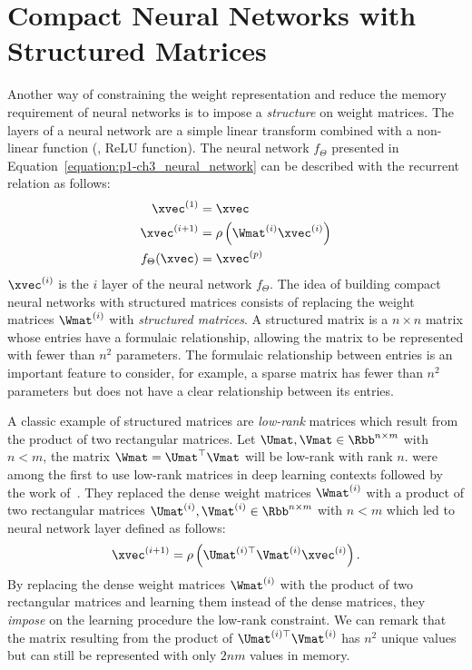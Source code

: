 %



\section{Compact Neural Networks with Structured Matrices}
\label{section:p1-ch3-compact_neural_networks_with_structured_matrices}


Another way of constraining the weight representation and reduce the memory requirement of neural networks is to impose a \emph{structure} on weight matrices. 
The layers of a neural network are a simple linear transform combined with a non-linear function (\eg, ReLU function). 
The neural network $f_\Theta$ presented in Equation~\ref{equation:p1-ch3_neural_network} can be described with the recurrent relation as follows:
\begin{align}
  \xvec^{(1)} &= \xvec \\
  \xvec^{(i+1)} &= \rho\left( \Wmat^{(i)} \xvec^{(i)} \right) \\
  f_\Theta(\xvec) &= \xvec^{(p)}
\end{align}
$\xvec^{(i)}$ is the $i$ layer of the neural network $f_\Theta$.
The idea of building compact neural networks with structured matrices consists of replacing the weight matrices $\Wmat^{(i)}$ with \emph{structured matrices}.
A structured matrix is a $n \times n$ matrix whose entries have a formulaic relationship, allowing the matrix to be represented with fewer than $n^2$ parameters.
The formulaic relationship between entries is an important feature to consider, for example, a sparse matrix has fewer than $n^2$ parameters but does not have a clear relationship between its entries.

A classic example of structured matrices are \emph{low-rank} matrices which result from the product of two rectangular matrices.
Let $\Umat, \Vmat \in \Rbb^{n \times m}$ with $n < m$, the matrix $\Wmat = \Umat^\top \Vmat$ will be low-rank with rank $n$.
\citet{denil2013predicting} were among the first to use low-rank matrices in deep learning contexts followed by the work of~\citet{jaderberg2014speeding,yu2017compressing}.
They replaced the dense weight matrices $\Wmat^{(i)}$ with a product of two rectangular matrices $\Umat^{(i)}, \Vmat^{(i)} \in \Rbb^{n \times m}$ with $n < m$ which led to neural network layer defined as follows:
\begin{equation}
  \xvec^{(i+1)} = \rho\left( \Umat^{(i)\top} \Vmat^{(i)} \xvec^{(i)} \right) .
\end{equation}
By replacing the dense weight matrices $\Wmat^{(i)}$ with the product of two rectangular matrices and learning them instead of the dense matrices, they \emph{impose} on the learning procedure the low-rank constraint.
We can remark that the matrix resulting from the product of $\Umat^{(i)\top} \Vmat^{(i)}$ has $n^2$ unique values but can still be represented with only $2nm$ values in memory.

